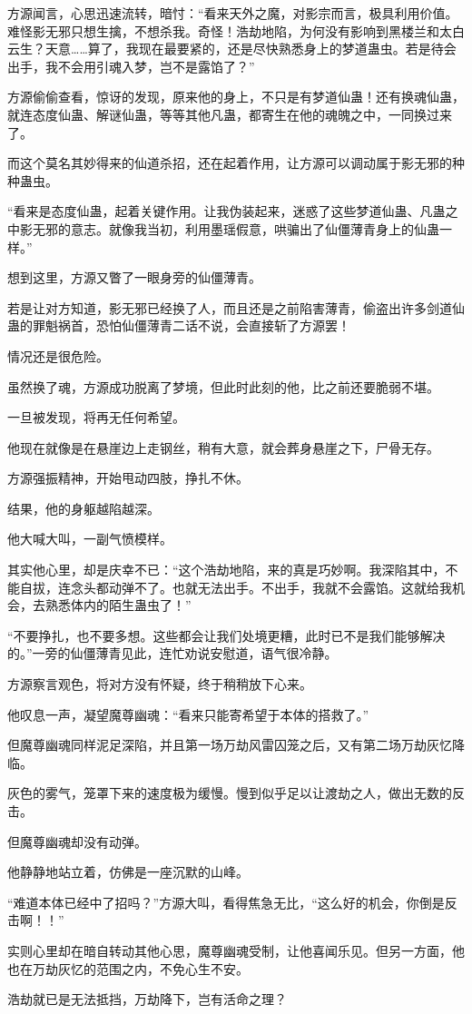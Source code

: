 \begin{this_body}
方源闻言，心思迅速流转，暗忖：“看来天外之魔，对影宗而言，极具利用价值。难怪影无邪只想生擒，不想杀我。奇怪！浩劫地陷，为何没有影响到黑楼兰和太白云生？天意……算了，我现在最要紧的，还是尽快熟悉身上的梦道蛊虫。若是待会出手，我不会用引魂入梦，岂不是露馅了？”

方源偷偷查看，惊讶的发现，原来他的身上，不只是有梦道仙蛊！还有换魂仙蛊，就连态度仙蛊、解谜仙蛊，等等其他凡蛊，都寄生在他的魂魄之中，一同换过来了。

而这个莫名其妙得来的仙道杀招，还在起着作用，让方源可以调动属于影无邪的种种蛊虫。

“看来是态度仙蛊，起着关键作用。让我伪装起来，迷惑了这些梦道仙蛊、凡蛊之中影无邪的意志。就像我当初，利用墨瑶假意，哄骗出了仙僵薄青身上的仙蛊一样。”

想到这里，方源又瞥了一眼身旁的仙僵薄青。

若是让对方知道，影无邪已经换了人，而且还是之前陷害薄青，偷盗出许多剑道仙蛊的罪魁祸首，恐怕仙僵薄青二话不说，会直接斩了方源罢！

情况还是很危险。

虽然换了魂，方源成功脱离了梦境，但此时此刻的他，比之前还要脆弱不堪。

一旦被发现，将再无任何希望。

他现在就像是在悬崖边上走钢丝，稍有大意，就会葬身悬崖之下，尸骨无存。

方源强振精神，开始甩动四肢，挣扎不休。

结果，他的身躯越陷越深。

他大喊大叫，一副气愤模样。

其实他心里，却是庆幸不已：“这个浩劫地陷，来的真是巧妙啊。我深陷其中，不能自拔，连念头都动弹不了。也就无法出手。不出手，我就不会露馅。这就给我机会，去熟悉体内的陌生蛊虫了！”

“不要挣扎，也不要多想。这些都会让我们处境更糟，此时已不是我们能够解决的。”一旁的仙僵薄青见此，连忙劝说安慰道，语气很冷静。

方源察言观色，将对方没有怀疑，终于稍稍放下心来。

他叹息一声，凝望魔尊幽魂：“看来只能寄希望于本体的搭救了。”

但魔尊幽魂同样泥足深陷，并且第一场万劫风雷囚笼之后，又有第二场万劫灰忆降临。

灰色的雾气，笼罩下来的速度极为缓慢。慢到似乎足以让渡劫之人，做出无数的反击。

但魔尊幽魂却没有动弹。

他静静地站立着，仿佛是一座沉默的山峰。

“难道本体已经中了招吗？”方源大叫，看得焦急无比，“这么好的机会，你倒是反击啊！！”

实则心里却在暗自转动其他心思，魔尊幽魂受制，让他喜闻乐见。但另一方面，他也在万劫灰忆的范围之内，不免心生不安。

浩劫就已是无法抵挡，万劫降下，岂有活命之理？

\end{this_body}


